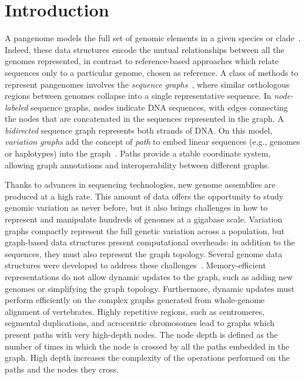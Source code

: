 \documentclass{bioinfo}
\begin{document}
    \maketitle


    \section{Introduction}

    A pangenome models the full set of genomic elements in a given species or clade~\citep{32453966}. Indeed, these
    data structures encode the mutual relationships between all the genomes represented, in contrast to reference-based
    approaches which relate sequences only to a particular genome, chosen as reference. A class of methods to represent
    pangenomes involves the \textit{sequence graphs}~\citep{2488477}, where similar orthologous regions between genomes
    collapse into a single representative sequence. In \textit{node-labeled} sequence graphs, nodes indicate DNA
    sequences, with edges connecting the nodes that are concatenated in the sequences represented in the graph. A
    \textit{bidirected} sequence graph represents both strands of DNA. On this model, \textit{variation graphs} add the
    concept of \textit{path} to embed linear sequences (e.g., genomes or haplotypes) into the graph~\citep{30125266}.
    Paths provide a stable coordinate system, allowing graph annotations and interoperability between different graphs.

    Thanks to advances in sequencing technologies, new genome assemblies are produced at a high rate. This amount of
    data offers the opportunity to study genomic variation as never before, but it also brings challenges in how to
    represent and manipulate hundreds of genomes at a gigabase scale. Variation graphs compactly represent the full
    genetic variation across a population, but graph-based data structures present computational overheads: in addition
    to the sequences, they must also represent the graph topology. Several genome data structures were developed to
    address these challenges~\citep{33040146}. Memory-efficient representations do not allow dynamic updates to the
    graph, such as adding new genomes or simplifying the graph topology. Furthermore, dynamic updates must perform
    efficiently on the complex graphs generated from whole-genome alignment of vertebrates. Highly repetitive regions,
    such as centromeres, segmental duplications, and acrocentric chromosomes lead to graphs which present paths with
    very high-depth nodes. The node depth is defined as the number of times in which the node is crossed by all the
    paths embedded in the graph. High depth increases the complexity of the operations performed on the paths and the
    nodes they cross.
\end{document}
